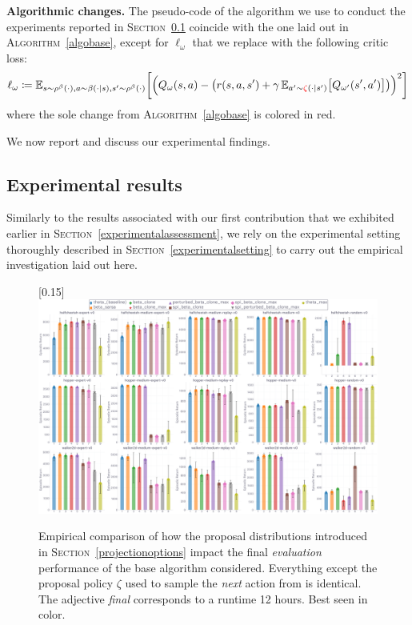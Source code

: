 \textbf{Algorithmic changes.}
The pseudo-code of the algorithm we use to conduct the experiments reported in \textsc{Section}~\ref{peresults}
coincide with the one laid out in \textsc{Algorithm}~\ref{algobase},
except for $\ell_\omega$ that we replace with the following critic loss:
\begin{align}
\ell_\omega \coloneqq
\mathbb{E}_{s \sim \rho^\beta(\cdot), a \sim \beta(\cdot | s), s' \sim \rho^\beta(\cdot)}
\bigg[
\Big(
Q_\omega(s,a) -
\big(
r(s, a, s') + \gamma \, \mathbb{E}_{a' \sim \textcolor{red}{\zeta}(\cdot | s')}
\big[
Q_{\omega'}(s',a')
\big]
\big)
\Big)^2
\bigg]
\end{align}
where the sole change from \textsc{Algorithm}~\ref{algobase} is colored in red.

We now report and discuss our experimental findings.

\subsection{Experimental results}
\label{peresults}
Similarly to the results associated with our first contribution
that we exhibited earlier in \textsc{Section}~\ref{experimentalassessment},
we rely on the experimental setting thoroughly described in \textsc{Section}~\ref{experimentalsetting}
to carry out the empirical investigation laid out here.

\begin{figure}[!h]
  \center\scalebox{0.15}[0.15]{\includegraphics{Plots/next/plots_main_eval_env_ret_barplot.pdf}}
  \caption{Empirical comparison of how the proposal distributions introduced
  in \textsc{Section}~\ref{projectionoptions}
  impact the final \emph{evaluation} performance of the base algorithm considered.
  Everything except the proposal policy $\zeta$ used to sample the \textit{next} action from is identical.
  The adjective \textit{final} corresponds to a runtime 12 hours. Best seen in color.}
  \label{next:barplot}
\end{figure}

